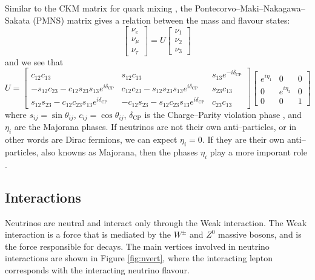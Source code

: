Similar to the CKM matrix for quark mixing \cite{pdg_ckm}, the Pontecorvo--Maki--Nakagawa--Sakata (PMNS) matrix \cite{pmns} gives a relation between the mass and flavour states:
\begin{equation}
  \begin{bmatrix}
    \nu_{e} \\
    \nu_{\mu} \\
    \nu_{\tau}
  \end{bmatrix}
  =
  U
  \begin{bmatrix}
    \nu_{1} \\
    \nu_{2} \\
    \nu_{3}
  \end{bmatrix}
  \, 
\end{equation}
and we see that
\begin{equation}
  U = 
  \begin{bmatrix}
    c_{12}c_{13} & s_{12}c_{13} & s_{13}e^{-i\delta_{\text{CP}}} \\
    -s_{12}c_{23}-c_{12}s_{23}s_{13}e^{i\delta_{\text{CP}}} & c_{12}c_{23} - s_{12}s_{23}s_{13}e^{i\delta_{\text{CP}}} & s_{23}c_{13} \\
    s_{12}s_{23}-c_{12}c_{23}s_{13}e^{i\delta_{\text{CP}}} & -c_{12}s_{23} - s_{12}c_{23}s_{13}e^{i\delta_{\text{CP}}} & c_{23}c_{13}
  \end{bmatrix}
  \begin{bmatrix}
    e^{i\eta_{1}} & 0 & 0 \\
    0 & e^{i\eta_{2}} & 0 \\
    0 & 0 & 1
  \end{bmatrix}
\end{equation}
where $s_{ij} = \sin\theta_{ij}$, $c_{ij}=\cos\theta_{ij}$, $\delta_{\text{CP}}$ is the Charge--Parity violation phase \cite{pmns}, and $\eta_{i}$ are the Majorana phases. If neutrinos are not their own anti--particles, or in other words are Dirac fermions, we can expect $\eta_{i} = 0$. If they are their own anti--particles, also knowns as Majorana, then the phases $\eta_{i}$ play a more imporant role \cite{pdg}. 

\subsection{Interactions}\label{subsec:int}

Neutrinos are neutral and interact only through the Weak interaction. The Weak interaction is a force that is mediated by the $W^{\pm}$ and $Z^{0}$ massive bosons, and is the force responsible for decays. The main vertices involved in neutrino interactions are shown in Figure \ref{fig:nvert}, where the interacting lepton corresponds with the interacting neutrino flavour. 

